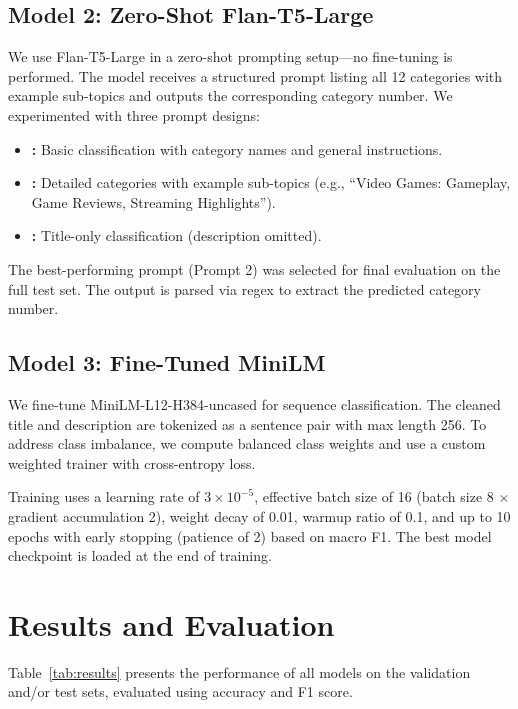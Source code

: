 \documentclass[11pt]{article}
\begin{document}
\subsection{Model 2: Zero-Shot Flan-T5-Large}

We use Flan-T5-Large \citep{chung2022scaling} in a zero-shot prompting setup---no fine-tuning is performed. The model receives a structured prompt listing all 12 categories with example sub-topics and outputs the corresponding category number. We experimented with three prompt designs:
\begin{itemize}
  \item \textbf{:} Basic classification with category names and general instructions.
  \item \textbf{:} Detailed categories with example sub-topics (e.g., ``Video Games: Gameplay, Game Reviews, Streaming Highlights'').
  \item \textbf{:} Title-only classification (description omitted).
\end{itemize}
The best-performing prompt (Prompt 2) was selected for final evaluation on the full test set. The output is parsed via regex to extract the predicted category number.

\subsection{Model 3: Fine-Tuned MiniLM}

We fine-tune MiniLM-L12-H384-uncased \citep{wang2020minilm} for sequence classification. The cleaned title and description are tokenized as a sentence pair with max length 256. To address class imbalance, we compute balanced class weights and use a custom weighted trainer with cross-entropy loss.

Training uses a learning rate of $3 \times 10^{-5}$, effective batch size of 16 (batch size 8 $\times$ gradient accumulation 2), weight decay of 0.01, warmup ratio of 0.1, and up to 10 epochs with early stopping (patience of 2) based on macro F1. The best model checkpoint is loaded at the end of training.

\section{Results and Evaluation}

Table~\ref{tab:results} presents the performance of all models on the validation and/or test sets, evaluated using accuracy and F1 score.
\end{document}
